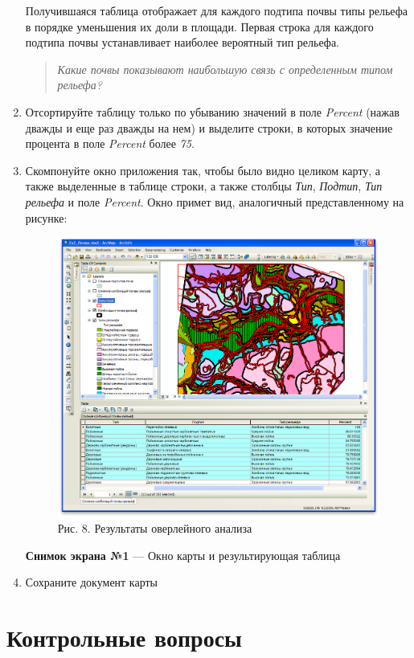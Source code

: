 \documentclass[]{book}
\theoremstyle{definition}
\theoremstyle{definition}
\theoremstyle{definition}
\theoremstyle{remark}
\begin{document}
\begin{enumerate}
  Получившаяся таблица отображает для каждого подтипа почвы типы рельефа
  в порядке уменьшения их доли в площади. Первая строка для каждого
  подтипа почвы устанавливает наиболее вероятный тип рельефа.

  \begin{quote}
  \emph{Какие почвы показывают наибольшую связь с определенным типом
  рельефа?}
  \end{quote}
\item
  Отсортируйте таблицу только по убыванию значений в поле \emph{Percent}
  (нажав дважды и еще раз дважды на нем) и выделите строки, в которых
  значение процента в поле \emph{Percent} более \emph{75}.
\item
  Скомпонуйте окно приложения так, чтобы было видно целиком карту, а
  также выделенные в таблице строки, а также столбцы \emph{Тип},
  \emph{Подтип}, \emph{Тип рельефа} и поле \emph{Percent}. Окно примет
  вид, аналогичный представленному на рисунке:

  \begin{figure}
  \centering
  \includegraphics{images/Ex10/image13.png}
  \caption{Рис. 8. Результаты оверлейного анализа}
  \end{figure}

  \textbf{Снимок экрана №1} --- Окно карты и результирующая таблица
\item
  Сохраните документ карты
\end{enumerate}

\hypertarget{overlay-questions}{%
\section{Контрольные вопросы}\label{overlay-questions}}
\end{document}
